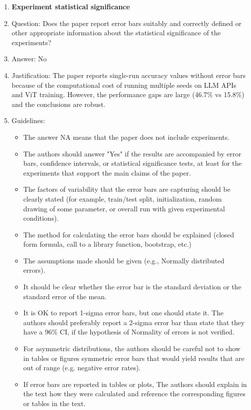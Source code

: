 \documentclass{article}
\newcommand{\answerNo}[1][]{No}
\begin{document}
\begin{enumerate}
\item {\bf Experiment statistical significance}
    \item[] Question: Does the paper report error bars suitably and correctly defined or other appropriate information about the statistical significance of the experiments?
    \item[] Answer: \answerNo{}
    \item[] Justification: The paper reports single-run accuracy values without error bars because of the computational cost of running multiple seeds on LLM APIs and ViT training. However, the performance gaps are large (46.7\% vs 15.8\%) and the conclusions are robust.
    \item[] Guidelines:
    \begin{itemize}
        \item The answer NA means that the paper does not include experiments.
        \item The authors should answer "Yes" if the results are accompanied by error bars, confidence intervals, or statistical significance tests, at least for the experiments that support the main claims of the paper.
        \item The factors of variability that the error bars are capturing should be clearly stated (for example, train/test split, initialization, random drawing of some parameter, or overall run with given experimental conditions).
        \item The method for calculating the error bars should be explained (closed form formula, call to a library function, bootstrap, etc.)
        \item The assumptions made should be given (e.g., Normally distributed errors).
        \item It should be clear whether the error bar is the standard deviation or the standard error of the mean.
        \item It is OK to report 1-sigma error bars, but one should state it. The authors should preferably report a 2-sigma error bar than state that they have a 96\% CI, if the hypothesis of Normality of errors is not verified.
        \item For asymmetric distributions, the authors should be careful not to show in tables or figures symmetric error bars that would yield results that are out of range (e.g. negative error rates).
        \item If error bars are reported in tables or plots, The authors should explain in the text how they were calculated and reference the corresponding figures or tables in the text.
    \end{itemize}


\end{enumerate}
\end{document}
